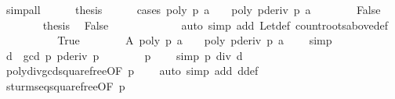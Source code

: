 \begin{isabellebody}
\ simp{\isacharunderscore}all\isanewline
\ \ \ \ \isamarkupfalse%
\ {\isacharquery}thesis\isanewline
\ \ \ \ \isamarkupfalse%
\ {\isacharparenleft}cases\ {\isachardoublequoteopen}{\isacharparenleft}poly\ p\ a\ {\isasymnoteq}\ {}\ {\isasymor}\ poly\ {\isacharparenleft}pderiv\ p{\isacharparenright}\ a\ {\isasymnoteq}\ {}{\isacharparenright}{\isachardoublequoteclose}{\isacharparenright}\isanewline
\ \ \ \ \isamarkupfalse%
\ False\isanewline
\ \ \ \ \ \ \isamarkupfalse%
\ {\isacharquery}thesis\ \isamarkupfalse%
\ False{}\ \isanewline
\ \ \ \ \ \ \ \ \ \ \isamarkupfalse%
\ {\isacharparenleft}auto\ simp\ add{\isacharcolon}\ Let{\isacharunderscore}def\ count{\isacharunderscore}roots{\isacharunderscore}above{\isacharunderscore}def{\isacharparenright}\isanewline
\ \ \ \ \isamarkupfalse%
\isanewline
\ \ \ \ \isamarkupfalse%
\ True\isanewline
\ \ \ \ \ \ \isamarkupfalse%
\ A{\isacharcolon}\ {\isachardoublequoteopen}poly\ p\ a\ {\isasymnoteq}\ {}\ {\isasymor}\ poly\ {\isacharparenleft}pderiv\ p{\isacharparenright}\ a\ {\isasymnoteq}\ {}{\isachardoublequoteclose}\ \isamarkupfalse%
\ simp\isanewline
\ \ \ \ \ \ \isamarkupfalse%
\ d\ {\isasymequiv}\ {\isachardoublequoteopen}gcd\ p\ {\isacharparenleft}pderiv\ p{\isacharparenright}{\isachardoublequoteclose}\isanewline
\ \ \ \ \ \ \isamarkupfalse%
\ {\isacharbackquoteopen}p\ {\isasymnoteq}\ {}{\isacharbackquoteclose}\ \isamarkupfalse%
\ {\isacharbrackleft}simp{\isacharbrackright}{\isacharcolon}\ {\isachardoublequoteopen}p\ div\ d\ {\isasymnoteq}\ {}{\isachardoublequoteclose}\ \isanewline
\ \ \ \ \ \ \ \ \ \ \isamarkupfalse%
\ poly{\isacharunderscore}div{\isacharunderscore}gcd{\isacharunderscore}squarefree{\isacharparenleft}{}{\isacharparenright}{\isacharbrackleft}OF\ {\isacharbackquoteopen}p\ {\isasymnoteq}\ {}{\isacharbackquoteclose}{\isacharbrackright}\ \isamarkupfalse%
\ {\isacharparenleft}auto\ simp\ add{\isacharcolon}\ d{\isacharunderscore}def{\isacharparenright}\isanewline
\ \ \ \ \ \ \isamarkupfalse%
\ sturm{\isacharunderscore}seq{\isacharunderscore}squarefree{\isacharprime}{\isacharbrackleft}OF\ {\isacharbackquoteopen}p\ {\isasymnoteq}\ {}{\isacharbackquoteclose}{\isacharbrackright}\isanewline
\ \ \ \ \ \ \ \ \ \ \isamarkupfalse%

\end{isabellebody}
